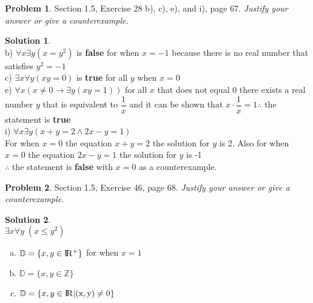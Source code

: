 \documentclass{article}
\theoremstyle{definition}
\newtheorem{problem}{Problem}
\newtheorem*{solution}{Solution}
\begin{document}
\begin{problem} Section 1.5, Exercise 28 b), c), e), and i), page 67. 
\textsl{Justify your answer or give a counterexample.}
\end{problem}
\begin{solution} \ \\
b) $\forall x \exists y (x = y^2) $ is \textbf{false} for when $x = -1$ because there is no real number that satisfies $y^2 = -1$ \vspace{8pt} \\
c) $\exists x \forall y(xy = 0)$ is \textbf{true} for all $y$ when $ x=0$ \vspace{8pt}\\
e) $\forall x (x \neq 0 \rightarrow \exists y (xy = 1))$ for all $x$ that does not equal 0 there exists a real number $y$ that is equivalent to $\dfrac{1}{x}$ and it can be shown that $x \cdot \dfrac{1}{x} = 1 \therefore$ the statement is \textbf{true} \vspace{8pt}\\
i) $\forall x \exists y (x + y = 2 \land 2x - y = 1)$ \\
For when $x = 0$ the equation $x+y=2$ the solution for $y$ is 2. Also for when $x = 0$ the equation $2x-y=1$ the solution for $y$ is -1 \\
$\therefore$ the statement is \textbf{false} with $x=0$ as a counterexample.
\end{solution}

\begin{problem} Section 1.5, Exercise 46, page 68.
\textsl{Justify your answer or give a counterexample.}
\end{problem}
\begin{solution}\ \\ $\exists x \forall y \; (x \leq y^2)$
\begin{enumerate}[a)]
  \item $\mathbb{D} = \{x,y \in \rm I\!R^+ \}$ for when $x=1$
  \item $\mathbb{D} = \{x,y \in \mathbb{Z} \} $
  \item $\mathbb{D} = \{x,y \in \rm{ I\!R} |(x,y) \neq 0 \}$
\end{enumerate}
\end{solution}
\end{document}
